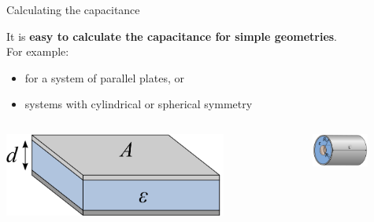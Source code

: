 %
%
%

\begin{frame}{Calculating the capacitance}

It is {\bf easy to calculate the capacitance for simple geometries}.\\
\vspace{0.2cm}
For example:
\begin{itemize}
  \item for a system of parallel plates, or
  \item systems with cylindrical or spherical symmetry
\end{itemize}

\begin{columns}
  \begin{column}{0.33\textwidth}
   \begin{center}
     \includegraphics[width=0.75\textwidth]{./images/schematics/capacitors_parallel_plate_1.png}\\
   \end{center}
  \end{column}
  \begin{column}{0.33\textwidth}
   \begin{center}
     \includegraphics[width=0.75\textwidth]{./images/schematics/capacitors_cylindrical_1.png}\\
   \end{center}
  \end{column}
  \begin{column}{0.33\textwidth}
   \begin{center}

\end{center}
\end{column}
\end{columns}
\end{frame}

